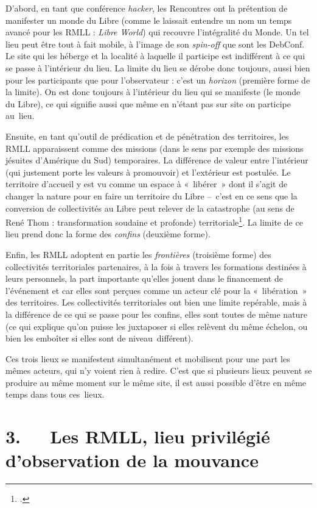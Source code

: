 \documentclass{FramateX}
\begin{document}
\begin{refsection}
D'abord, en tant que conférence \textit{hacker}, les Rencontres ont la
prétention de manifester un monde du Libre (comme le laissait entendre
un nom un temps avancé pour les RMLL : \textit{Libre World}) qui recouvre
l'intégralité du Monde. Un tel lieu peut être tout à fait mobile, à
l'image de son \textit{spin-off} que sont les DebConf. Le site qui les
héberge et la localité à laquelle il participe est indifférent à ce qui
se passe à l'intérieur du lieu. La limite du lieu se dérobe donc
toujours, aussi bien pour les participants que pour l'observateur :
c'est un \textit{horizon} (première forme de la limite). On est donc
toujours à l'intérieur du lieu qui se manifeste (le monde du Libre), ce
qui signifie aussi que même en n'étant pas sur site on participe
au~lieu.

Ensuite, en tant qu'outil de prédication et de pénétration des
territoires, les RMLL apparaissent comme des missions (dans le sens par
exemple des missions jésuites d'Amérique du Sud) temporaires. La
différence de valeur entre l'intérieur (qui justement porte les valeurs
à promouvoir) et l'extérieur est postulée. Le territoire d'accueil y
est vu comme un espace à «~libérer~» dont il s'agit de changer la
nature pour en faire un territoire du Libre –~c'est en ce sens que la
conversion de collectivités au Libre peut relever de la catastrophe (au
sens de René Thom : transformation soudaine et profonde) territoriale\footnote{\cite[p.~36]{giraudles2010}.}. La limite de ce lieu prend donc la forme des
\textit{confins} (deuxième forme).

Enfin, les RMLL adoptent en partie les \textit{frontières} (troisième
forme) des collectivités territoriales partenaires, à la fois à travers
les formations destinées à leurs personnels, la part importante
qu'elles jouent dans le financement de l'événement et car elles sont
perçues comme un acteur clé pour la «~libération~» des territoires. Les
collectivités territoriales ont bien une limite repérable, mais à la
différence de ce qui se passe pour les confins, elles sont toutes de
même nature (ce qui explique qu'on puisse les juxtaposer si elles
relèvent du même échelon, ou bien les emboîter si elles sont de
niveau~différent).

Ces trois lieux se manifestent simultanément et mobilisent pour une part
les mêmes acteurs, qui n'y voient rien à redire. C'est que si plusieurs
lieux peuvent se produire au même moment sur le même site, il est aussi
possible d'être en même temps dans tous ces~lieux.

\section*{3.~~~Les RMLL, lieu privilégié d'observation de la mouvance}
{}


\end{refsection}
\end{document}
